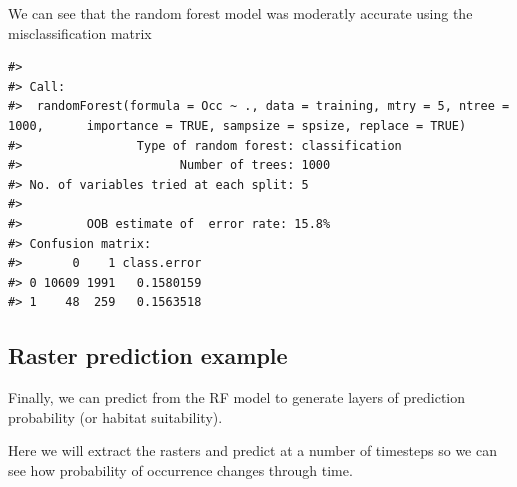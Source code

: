 \documentclass[
]{article}
\begin{document}
We can see that the random forest model was moderatly accurate using the
misclassification matrix

\begin{verbatim}
#> 
#> Call:
#>  randomForest(formula = Occ ~ ., data = training, mtry = 5, ntree = 1000,      importance = TRUE, sampsize = spsize, replace = TRUE) 
#>                Type of random forest: classification
#>                      Number of trees: 1000
#> No. of variables tried at each split: 5
#> 
#>         OOB estimate of  error rate: 15.8%
#> Confusion matrix:
#>       0    1 class.error
#> 0 10609 1991   0.1580159
#> 1    48  259   0.1563518
\end{verbatim}

\subsection{Raster prediction example}\label{raster-prediction-example}

Finally, we can predict from the RF model to generate layers of
prediction probability (or habitat suitability).

Here we will extract the rasters and predict at a number of timesteps so
we can see how probability of occurrence changes through time.
\end{document}
